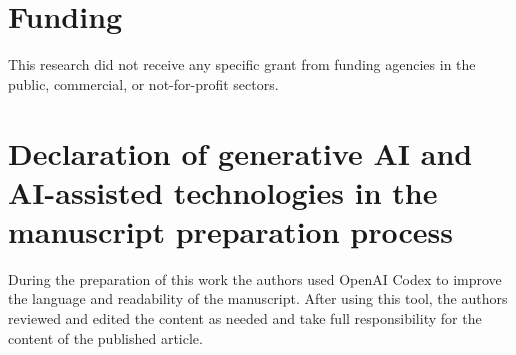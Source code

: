 \documentclass[preprint,12pt,numbers]{elsarticle}
\theoremstyle{definition}
\begin{document}
\section*{Funding}
This research did not receive any specific grant from funding agencies in
the public, commercial, or not-for-profit sectors.

\section*{Declaration of generative AI and AI-assisted technologies in the manuscript preparation process}
During the preparation of this work the authors used OpenAI Codex to improve
the language and readability of the manuscript. After using this tool, the
authors reviewed and edited the content as needed and take full
responsibility for the content of the published article.



\end{document}
